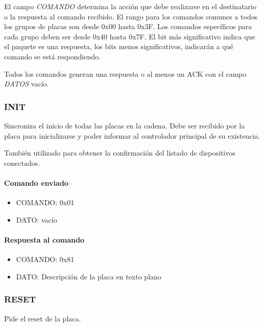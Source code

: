 El campo \emph{COMANDO} determina la acci\'on que debe realizarse en el destinatario o la respuesta al comando recibido.
El rango para los comandos comunes a todos los grupos de placas son desde 0x00 hasta 0x3F.
Los comandos espec\'ificos para cada grupo deben ser desde 0x40 hasta 0x7F.
El bit m\'as significativo indica que el paquete es una respuesta, los bits menos significativos, indicar\'an a qu\'e comando se est\'a respondiendo.

Todos los comandos generan una respuesta o al menos un ACK con el campo \emph{DATOS} vac\'io.

\subsubsection{INIT}
\label{hA_protocolo_init}

Sincroniza el inicio de todas las placas en la cadena.
Debe ser recibido por la placa para inicializarse y poder informar al controlador principal de su existencia.

Tambi\'en utilizado para obtener la confirmaci\'on del listado de dispositivos conectados.

\paragraph*{Comando enviado}
\label{hA_protocolo_init_comando_enviado}

\begin{itemize}
	\item{COMANDO:} 0x01
	\item{DATO:} vac\'io
\end{itemize}

\paragraph*{Respuesta al comando}
\label{hA_protocolo_init_respuesta}

\begin{itemize}
	\item{COMANDO:} 0x81
	\item{DATO:} Descripci\'on de la placa en texto plano
\end{itemize}

\subsubsection{RESET}
\label{hA_protocolo_reset}

Pide el reset de la placa.

